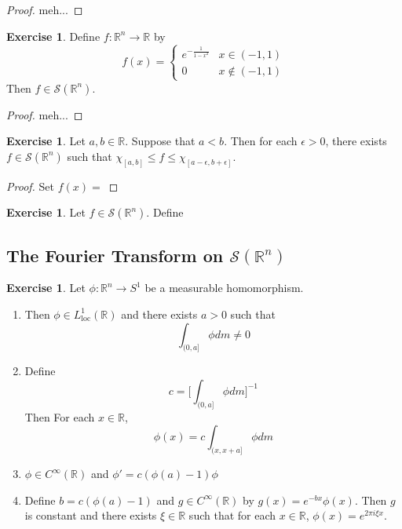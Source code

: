 \documentclass[12pt]{amsart}
\theoremstyle{definition}
\newtheorem{ex}[definition]{Exercise}
\newcommand{\ep}{\epsilon}
\newcommand{\R}{\mathbb{R}}
\newcommand{\MS}{\mathcal{S}}
\newcommand{\loc}{\text{loc}}
\newcommand{\lex}[1]{\label{ex:#1}}
\begin{document}
	\begin{proof}
		meh...
	\end{proof}
	

	\begin{ex}
		Define $f:\R^n \rightarrow \R$ by 
		\[
		f(x) = 
		\begin{cases}
			e^{- \frac{1}{1-x^2}} & x \in (-1, 1) \\
			0 & x \not \in (-1, 1)
		\end{cases}
		\]
		Then $f \in \MS(\R^n)$.
	\end{ex}
	
	\begin{proof}
		meh...
	\end{proof}

	\begin{ex}
		Let $a,b \in \R$. Suppose that $a < b$. Then for each $\ep >0$, there exists $f \in \MS(\R^n)$ such that $\chi_{[a,b]} \leq f \leq \chi_{[a-\ep , b + \ep]}$.
	\end{ex}

	\begin{proof}
		Set $f(x) = $
	\end{proof}

	\begin{ex}
		Let $f \in \MS(\R^n)$. Define
	\end{ex}
	
	
	
	
	
	
	
	
	
	
	
	
	
	
	
	
	
	
	\newpage
	\subsection{The Fourier Transform on $\MS(\R^n)$}
	
	\begin{ex}
		\lex{300} Let $\phi:\R^n \rightarrow S^1$ be a measurable homomorphism. 
		\begin{enumerate}
			\item Then $\phi \in L^1_{\loc}(\R)$ and there exists $a > 0$ such that $$\int_{(0,a]}\phi dm \neq 0$$
			\item Define $$c = \bigg[ \int_{(0,a]}\phi dm \bigg]^{-1}$$ 
			Then  For each $x \in \R$, $$\phi(x) = c\int_{(x, x+a]}\phi dm$$ 
			\item $\phi \in C^{\infty}(\R)$ and $\phi' = c(\phi(a) - 1)\phi$
			\item Define $b = c(\phi(a) - 1)$ and $g \in C^{\infty}(\R)$ by $g(x) = e^{-bx} \phi(x)$. Then $g$ is constant and there exists $\xi \in \R$ such that for each $x \in \R$, $\phi(x) = e^{2 \pi i \xi x}$.
		\end{enumerate}
	\end{ex}	
	
\end{document}
